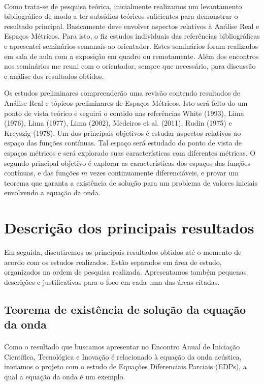 \documentclass[a4paper,12pt]{article}
\begin{document}
\paragraph*{}

Como trata-se de pesquisa teórica, inicialmente realizamos um
levantamento bibliográfico de modo a ter subsídios teóricos suficientes para
demonstrar o resultado principal. Basicamente deve envolver aspectos relativos à
Análise Real e Espaços Métricos. Para isto, o fiz estudos individuais das
referências bibliográficas e apresentei seminários semanais ao orientador.
Estes seminários foram realizados em sala de aula com a exposição em quadro ou
remotamente. Além dos encontros nos seminários me reuni com o
orientador, sempre que necessário, para discussão e análise dos resultados obtidos.


Os estudos preliminares compreenderão uma revisão contendo resultados de
Análise Real e tópicos preliminares de Espaços Métricos. Isto será feito do um ponto
de vista teórico e seguirá o contido nas referências White (1993), Lima (1976), Lima
(1977), Lima (2002), Medeiros et al. (2011), Rudin (1975) e Kreyszig (1978). Um dos
principais objetivos é estudar aspectos relativos ao espaço das funções contínuas. Tal
espaço será estudado do ponto de vista de espaços métricos e será explorado suas
características com diferentes métricas. O segundo principal objetivo é explorar as
características dos espaços das funções contínuas, e das funções $m$ vezes
continuamente diferenciáveis, e provar um teorema que garanta a existência de
solução para um problema de valores iniciais envolvendo a equação da onda.

\section{Descrição dos principais resultados}

Em seguida, discutiremos os principais resultados obtidos até o momento de acordo com os estudos realizados.
Estão separados em área de estudo, organizados na ordem de pesquisa realizada. Apresentamos também
pequenas descrições e justificativas para o foco em cada uma das áreas citadas.

\subsection{Teorema de existência de solução da equação da onda}
\paragraph*{}
Como o resultado que buscamos apresentar no Encontro Anual de Iniciação Científica,
Tecnológica e Inovação é relacionado à equação da onda acústica, iniciamos o projeto com o estudo de Equações Diferenciais Parciais (EDPs),
a qual a equação da onda é um exemplo.
\end{document}
